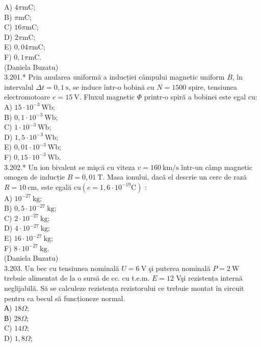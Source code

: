 \documentclass[10pt]{article}
\begin{document}
A) $4 \pi \mathrm{mC}$;\\
B) $\pi \mathrm{mC}$;\\
C) $16 \pi \mathrm{mC}$;\\
D) $2 \pi \mathrm{mC}$;\\
E) $0,04 \pi \mathrm{mC}$;\\
F) $0,1 \pi \mathrm{mC}$.\\
(Daniela Buzatu)\\
3.201.* Prin anularea uniformă a inducției câmpului magnetic uniform $B$, în intervalul $\Delta t=0,1 \mathrm{~s}$, se induce într-o bobină cu $N=1500$ spire, tensiunea electromotoare $e=15 \mathrm{~V}$. Fluxul magnetic $\Phi$ printr-o spiră a bobinei este egal cu:\\
A) $15 \cdot 10^{-3} \mathrm{~Wb}$;\\
B) $0,1 \cdot 10^{-3} \mathrm{~Wb}$;\\
C) $1 \cdot 10^{-3} \mathrm{~Wb}$;\\
D) $1,5 \cdot 10^{-3} \mathrm{~Wb}$;\\
E) $0,01 \cdot 10^{-3} \mathrm{~Wb}$;\\
F) $0,15 \cdot 10^{-3} \mathrm{~Wb}$.\\
3.202.* Un ion bivalent se mişcă cu viteza $v=160 \mathrm{~km} / \mathrm{s}$ într-un câmp magnetic omogen de inducție $B=0,01 \mathrm{~T}$. Masa ionului, dacǎ el descrie un cerc de rază $R=10 \mathrm{~cm}$, este egală $\mathrm{cu}\left(e=1,6 \cdot 10^{-19} \mathrm{C}\right)$ :\\
A) $10^{-27} \mathrm{~kg}$;\\
B) $0,5 \cdot 10^{-27} \mathrm{~kg}$;\\
C) $2 \cdot 10^{-27} \mathrm{~kg}$;\\
D) $4 \cdot 10^{-27} \mathrm{~kg}$;\\
E) $16 \cdot 10^{-27} \mathrm{~kg}$;\\
F) $8 \cdot 10^{-27} \mathrm{~kg}$.\\
(Daniela Buzatu)\\
3.203. Un bec cu tensiunea nominală $U=6 \mathrm{~V}$ şi puterea nominală $P=2 \mathrm{~W}$ trebuie alimentat de la o sursă de cc. cu t.e.m. $E=12$ Vşi rezistența internă neglijabilă. Să se calculeze rezistența rezistorului ce trebuie montat în circuit pentru ca becul să funcționeze normal.\\
А) $18 \Omega$;\\
В) $28 \Omega$;\\
C) $14 \Omega$;\\
D) $1,8 \Omega$;\\
\end{document}
